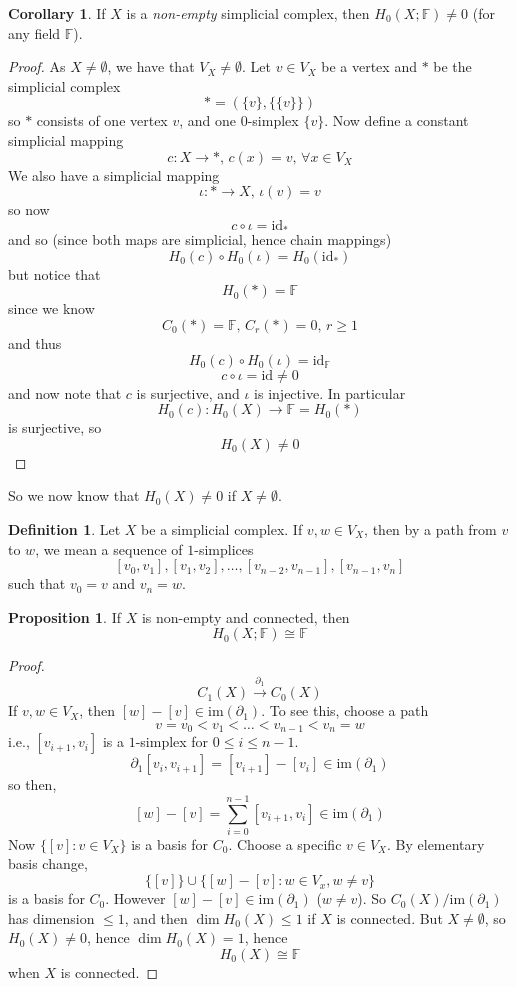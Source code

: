 \documentclass[a4paper,14pt]{extarticle}
\theoremstyle{definition}
\newtheorem*{definition}{Definition}
\newtheorem*{corollary}{Corollary}
\newtheorem*{proposition}{Proposition}
\begin{document}
\begin{corollary}
If $X$ is a \emph{non-empty} simplicial complex, then $H_0(X;\mathbb{F})\neq0$ (for any field $\mathbb{F}$).
\end{corollary}

\begin{proof}
	As $X\neq\emptyset$, we have that $V_X\neq\emptyset$. Let $v\in V_X$ be a vertex and $*$ be the simplicial complex \[*=(\{v\},\{\{v\}\})\] so $*$ consists of one vertex
	$v$, and one $0$-simplex $\{v\}$. Now define a constant simplicial mapping \[c:X\rightarrow *, \,c(x)=v,\,\forall x\in V_X\] We also have a simplicial mapping 
	\[\iota:*\rightarrow X, \,\iota(v)=v\] so now \[c\circ\iota=\text{id}_*\] and so
	(since both maps are simplicial, hence chain mappings) \[H_0(c)\circ H_0(\iota)=H_0(\text{id}_*)\] but notice that \[H_0(*)=\mathbb{F}\] since we know
	\[C_0(*)=\mathbb{F}, \,C_r(*)=0,\,r\geq1\] and thus \[H_0(c)\circ H_0(\iota)=\text{id}_\mathbb{F}\] \[c\circ\iota=\text{id}\neq0\] and now note that $c$ is surjective,
	and $\iota$ is injective. In particular \[H_0(c):H_0(X)\rightarrow\mathbb{F}=H_0(*)\] is surjective, so \[H_0(X)\neq0\]
\end{proof}

\noindent So we now know that $H_0(X)\neq0$ if $X\neq\emptyset$.

\vspace{12pt}

\begin{definition}
	Let $X$ be a simplicial complex. If $v,w\in V_X$, then by a path from $v$ to $w$, we mean
a sequence of $1$-simplices \[[v_0,v_1],[v_1,v_2],\ldots,[v_{n-2},v_{n-1}],[v_{n-1},v_n]\]
such that $v_0=v$ and $v_n=w$.
\end{definition}

\begin{proposition}
	If $X$ is non-empty and connected, then \[H_0(X;\mathbb{F})\cong\mathbb{F}\]
\end{proposition}

\begin{proof}
	\[C_1(X)\xrightarrow{\partial_1} C_0(X)\]
	If $v,w\in V_X$, then $[w]-[v]\in\text{im}(\partial_1)$. To see this, choose a path
	\[v=v_0<v_1<\ldots<v_{n-1}<v_n=w\] i.e., $[v_{i+1},v_i]$ is a $1$-simplex for
	$0\leq i\leq n-1$. \[\partial_1[v_i,v_{i+1}]=[v_{i+1}]-[v_i]\in\text{im}(\partial_1)\]
	so then, \[[w]-[v]=\sum_{i=0}^{n-1}[v_{i+1},v_i]\in\text{im}(\partial_1)\]
	Now $\{[v]:v\in V_X\}$ is a basis for $C_0$. Choose a specific $v\in V_X$. By elementary
	basis change, \[\{[v]\}\cup\{[w]-[v]:w\in V_x,w\neq v\}\] is a basis for $C_0$.
	However $[w]-[v]\in\text{im}(\partial_1)$ ($w\neq v$). So $C_0(X)/\text{im}(\partial_1)$ has
	dimension $\leq 1$, and then $\dim H_0(X)\leq 1$ if $X$ is connected. But $X\neq\emptyset$, so $H_0(X)\neq0$, hence
	$\dim H_0(X)=1$, hence \[H_0(X)\cong \mathbb{F}\] when $X$ is connected.
\end{proof}
\end{document}
